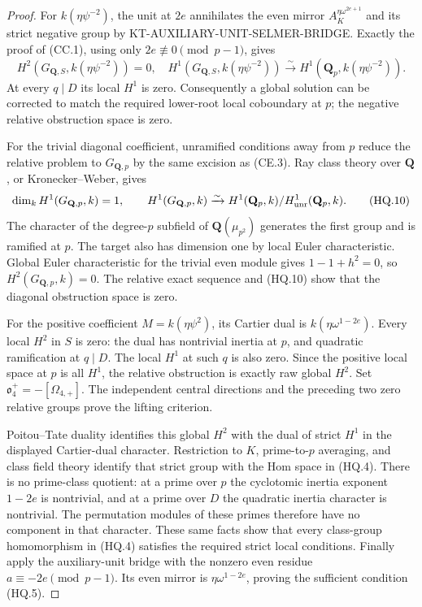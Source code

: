 \documentclass[11pt,a4paper]{article}
\theoremstyle{definition}
\begin{document}
\begin{proof}
For \(k(\eta\psi^{-2})\), the unit at \(2e\)
annihilates the even mirror
\(A_K^{\eta\omega^{2e+1}}\) and its strict
negative group by KT-AUXILIARY-UNIT-SELMER-BRIDGE.
Exactly the proof of (CC.1), using only
\(2e\not\equiv0\pmod{p-1}\), gives
\[
 H^2(G_{\mathbf Q,S},k(\eta\psi^{-2}))=0,
 \quad H^1(G_{\mathbf Q,S},k(\eta\psi^{-2}))
      \xrightarrow{\sim}H^1(\mathbf Q_p,k(\eta\psi^{-2})).
                                                        \tag{HQ.9}
\]
At every \(q\mid D\) its local \(H^1\) is zero.
Consequently a global solution can be corrected to
match the required lower-root local coboundary at
\(p\); the negative relative obstruction space is zero.

For the trivial diagonal coefficient, unramified
conditions away from \(p\) reduce the relative problem
to \(G_{\mathbf Q,p}\) by the same excision as (CE.3).
Ray class theory over \(\mathbf Q\), or Kronecker--Weber,
gives
\[
 \dim_k H^1(G_{\mathbf Q,p},k)=1,\qquad
 H^1(G_{\mathbf Q,p},k)
    \xrightarrow{\sim}
 H^1(\mathbf Q_p,k)/H^1_{\rm unr}(\mathbf Q_p,k).
                                                        \tag{HQ.10}
\]
The character of the degree-\(p\) subfield of
\(\mathbf Q(\mu_{p^2})\) generates the first group
and is ramified at \(p\).  The target also has
dimension one by local Euler characteristic.
Global Euler characteristic for the trivial even
module gives \(1-1+h^2=0\), so
\(H^2(G_{\mathbf Q,p},k)=0\).
The relative exact sequence and (HQ.10) show that
the diagonal obstruction space is zero.

For the positive coefficient \(M=k(\eta\psi^2)\),
its Cartier dual is \(k(\eta\omega^{1-2e})\).
Every local \(H^2\) in \(S\) is zero: the dual
has nontrivial inertia at \(p\), and quadratic
ramification at \(q\mid D\).  The local \(H^1\)
at such \(q\) is also zero.  Since the positive
local space at \(p\) is all \(H^1\), the relative
obstruction is exactly raw global \(H^2\).
Set \(\mathfrak o_4^+=-[\Omega_{4,+}]\).
The independent central directions and the preceding
two zero relative groups prove the lifting criterion.

Poitou--Tate duality identifies this global \(H^2\)
with the dual of strict \(H^1\) in the displayed
Cartier-dual character.  Restriction to \(K\),
prime-to-\(p\) averaging, and class field theory
identify that strict group with the Hom space in
(HQ.4).  There is no prime-class quotient: at a
prime over \(p\) the cyclotomic inertia exponent
\(1-2e\) is nontrivial, and at a prime over \(D\)
the quadratic inertia character is nontrivial.
The permutation modules of these primes therefore
have no component in that character.  These same
facts show that every class-group homomorphism in
(HQ.4) satisfies the required strict local conditions.
Finally apply the auxiliary-unit bridge with the
nonzero even residue \(a\equiv-2e\pmod{p-1}\).
Its even mirror is \(\eta\omega^{1-2e}\), proving
the sufficient condition (HQ.5).
\end{proof}
\end{document}
